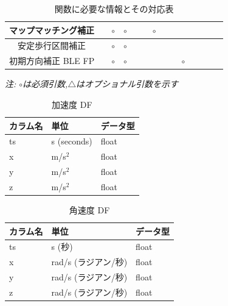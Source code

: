 \documentclass[Japanese]{dicomopapers}
\begin{document}
\begin{table}[ht]
{\begin{tabular}{|c|c|c|c|c|c|c|c|c|c|c|c|c|c|}
			マップマッチング補正    &                                            & \multicolumn{1}{c|}{$\circ$} & \multicolumn{1}{c|}{$\circ$} &                              &                              & \multicolumn{1}{c|}{$\circ$} &                                                                                                               &                              &                              &                                  &    &                              &    \\ \hline
			安定歩行区間補正      &                                            & \multicolumn{1}{c|}{$\circ$} & \multicolumn{1}{c|}{$\circ$} &                              &                              &                              &                                                                                                               &                              &                              &                                  &    &                              &    \\ \hline
			初期方向補正 BLE FP &                                            & \multicolumn{1}{c|}{$\circ$} & \multicolumn{1}{c|}{$\circ$} &                              &                              &                              &                                                                                                               &                              & \multicolumn{1}{c|}{$\circ$} &                                  &    &                              &    \\ \hline
		\end{tabular}
	}
	\caption{関数に必要な情報とその対応表} \label{}
	\textit{注: $\circ$は必須引数,$\triangle$はオプショナル引数を示す} \label{tab:my_label}
\end{table}


\begin{table}[h]
	\centering
	\begin{tabular}{lll}
		\toprule
		カラム名 & 単位          & データ型  \\
		\midrule
		ts   & s (seconds) & float \\
		x    & m/s\(^2\)   & float \\
		y    & m/s\(^2\)   & float \\
		z    & m/s\(^2\)   & float \\
		\bottomrule
	\end{tabular}
	\caption{加速度 DF}
\end{table}

\begin{table}[h]
	\centering
	\begin{tabular}{lll}
		\toprule
		カラム名 & 単位             & データ型  \\
		\midrule
		ts   & s (秒)          & float \\
		x    & rad/s (ラジアン/秒) & float \\
		y    & rad/s (ラジアン/秒) & float \\
		z    & rad/s (ラジアン/秒) & float \\
		\bottomrule
	\end{tabular}
	\caption{角速度 DF}
\end{table}
\end{document}
